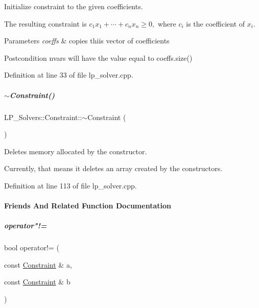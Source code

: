 Initialize constraint to the given coefficients. 

The resulting constraint is $ c_1x_1 + \cdots + c_nx_n \geq 0, $ where $ c_i $ is the coefficient of $ x_i $. 
\begin{DoxyParams}{Parameters}
{\em coeffs} & copies thiis vector of coefficients \\
\hline
\end{DoxyParams}
\begin{DoxyPostcond}{Postcondition}
{\ttfamily nvars} will have the value equal to {\ttfamily coeffs.\+size()} 
\end{DoxyPostcond}


Definition at line 33 of file lp\+\_\+solver.\+cpp.

\mbox{\label{group___c_l_s_solvers_a2949083e68c41842b613bd8cf78c6389}} 
\subparagraph{\texorpdfstring{$\sim$\+Constraint()}{~Constraint()}}
{\footnotesize\ttfamily L\+P\+\_\+\+Solvers\+::\+Constraint\+::$\sim$\+Constraint (\begin{DoxyParamCaption}{ }\end{DoxyParamCaption})}



Deletes memory allocated by the constructor. 

Currently, that means it deletes an array created by the constructors. 

Definition at line 113 of file lp\+\_\+solver.\+cpp.



\paragraph{Friends And Related Function Documentation}
\mbox{\label{group___c_l_s_solvers_ab67011dc88bf8927d50bf3806e792f8b}} 
\subparagraph{\texorpdfstring{operator"!=}{operator!=}}
{\footnotesize\ttfamily bool operator!= (\begin{DoxyParamCaption}\item[{const \hyperlink{group___c_l_s_solvers_class_l_p___solvers_1_1_constraint}{Constraint} \&}]{a,  }\item[{const \hyperlink{group___c_l_s_solvers_class_l_p___solvers_1_1_constraint}{Constraint} \&}]{b }\end{DoxyParamCaption})\hspace{0.3cm}{\ttfamily [friend]}}



